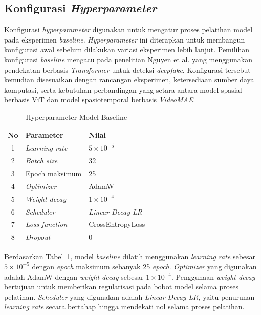 \subsection{Konfigurasi \textit{Hyperparameter}} \label{IV.Hyperparameter}
Konfigurasi \textit{hyperparameter} digunakan untuk mengatur proses pelatihan model pada eksperimen \textit{baseline}. \textit{Hyperparameter} ini diterapkan untuk membangun konfigurasi awal sebelum dilakukan variasi eksperimen lebih lanjut. Pemilihan konfigurasi \textit{baseline} mengacu pada penelitian Nguyen et al. \cite{nguyen2024fakeformerefficientvulnerabilitydriventransformers} yang menggunakan pendekatan berbasis \textit{Transformer} untuk deteksi \textit{deepfake}. Konfigurasi tersebut kemudian disesuaikan dengan rancangan eksperimen, ketersediaan sumber daya komputasi, serta kebutuhan perbandingan yang setara antara model spasial berbasis ViT dan model spasiotemporal berbasis \textit{VideoMAE}.

\begin{table}[htbp]
	\centering
	\caption{Hyperparameter Model Baseline}
	\label{table:4.hyperparam}
	\begin{tabular}{cll}
		\toprule
		\textbf{No} & \textbf{Parameter} & \textbf{Nilai} \\
		\midrule
		1 & \textit{Learning rate} & $5\times10^{-5}$ \\
		2 & \textit{Batch size} & 32 \\
		3 & Epoch maksimum & 25 \\
		4 & \textit{Optimizer} & AdamW \\
		5 & \textit{Weight decay} & $1\times10^{-4}$ \\
		6 & \textit{Scheduler} & \textit{Linear Decay LR} \\
		7 & \textit{Loss function} & CrossEntropyLoss \\
		8 & \textit{Dropout} & 0 \\
		\bottomrule
	\end{tabular}
\end{table}

Berdasarkan Tabel~\ref{table:4.hyperparam}, model \textit{baseline} dilatih menggunakan \textit{learning rate} sebesar $5\times10^{-5}$ dengan \textit{epoch} maksimum sebanyak 25 \textit{epoch}. \textit{Optimizer} yang digunakan adalah AdamW dengan \textit{weight decay} sebesar $1\times10^{-4}$. Penggunaan \textit{weight decay} bertujuan untuk memberikan regularisasi pada bobot model selama proses pelatihan. \textit{Scheduler} yang digunakan adalah \textit{Linear Decay LR}, yaitu penurunan \textit{learning rate} secara bertahap hingga mendekati nol selama proses pelatihan.

